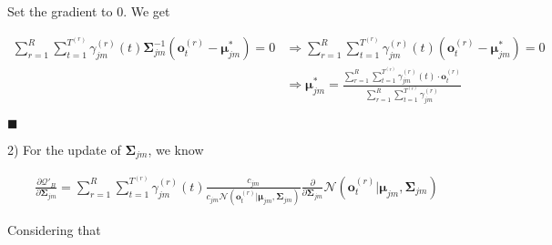 \documentclass{article}
\renewcommand{\qedsymbol}{\hfill $\blacksquare$\par}
\begin{document}
    Set the gradient to 0. We get
    
    \vspace{-2.5em}
    \begin{align*}
        \sum_{r=1}^R\sum_{t=1}^{T^{(r)}}\gamma_{jm}^{(r)}(t)\boldsymbol{\Sigma}_{jm}^{-1}\left(\mathbf{o}_t^{(r)}-\boldsymbol{\mu}_{jm}^*\right) = 0 &\Longrightarrow \sum_{r=1}^R\sum_{t=1}^{T^{(r)}}\gamma_{jm}^{(r)}(t)\left(\mathbf{o}_t^{(r)}-\boldsymbol{\mu}_{jm}^*\right)=0 \\
        &\Longrightarrow \boldsymbol{\mu}_{jm}^* = \frac{\sum_{r=1}^R\sum_{t=1}^{T^{(r)}}\gamma_{jm}^{(r)}(t)\cdot\mathbf{o}_t^{(r)}}{\sum_{r=1}^R\sum_{t=1}^{T^{(r)}}\gamma_{jm}^{(r)}}
    \end{align*}
    
    \vspace{-3.6em} \qedsymbol
    
\vspace{3.6em}
\hspace{-2.3em}
2)\quad
    For the update of $\boldsymbol{\Sigma}_{jm}$, we know
   
    \vspace{-2.5em}
    \begin{align*}
        \frac{\partial\mathcal{Q}'_B}{\partial\boldsymbol{\Sigma}_{jm}} = \sum_{r=1}^R\sum_{t=1}^{T^{(r)}}\gamma_{jm}^{(r)}(t)\frac{c_{jm}}{c_{jm}\mathcal{N}\left(\mathbf{o}^{(r)}_t|\boldsymbol{\mu}_{jm},\boldsymbol{\Sigma}_{jm}\right)}\frac{\partial}{\partial\boldsymbol{\Sigma}_{jm}}\mathcal{N}\left(\mathbf{o}^{(r)}_t|\boldsymbol{\mu}_{jm},\boldsymbol{\Sigma}_{jm}\right) 
    \end{align*}
    
    \vspace{-1em}
    Considering that
    
\end{document}
